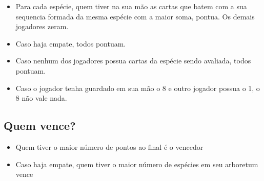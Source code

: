 \documentclass[11pt]{article}
\begin{document}
\begin{itemize}
\item Para cada espécie, quem tiver na sua mão as cartas que batem com a sua sequencia formada da mesma espécie com a maior soma, pontua. Os demais jogadores zeram.
\item Caso haja empate, todos pontuam.
\item Caso nenhum dos jogadores possua cartas da espécie sendo avaliada, todos pontuam.
\item Caso o jogador tenha guardado em sua mão o 8 e outro jogador possua o 1, o 8 não vale nada.
\end{itemize}

\subsection{Quem vence?}
\label{sec:org57f0b41}

\begin{itemize}
\item Quem tiver o maior número de pontos ao final é o vencedor
\item Caso haja empate, quem tiver o maior número de espécies em seu arboretum vence
\end{itemize}
\end{document}
